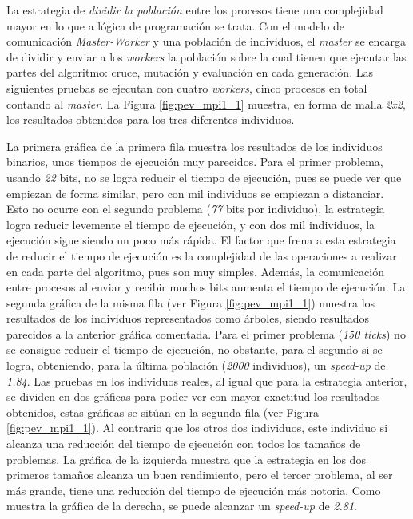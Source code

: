 \newpage



La estrategia de \textit{dividir la población} entre los procesos tiene una complejidad mayor en lo que a lógica de programación se trata. Con el modelo de comunicación \textit{Master-Worker} y una población de individuos, el \textit{master} se encarga de dividir y enviar a los \textit{workers} la población sobre la cual tienen que ejecutar las partes del algoritmo: cruce, mutación y evaluación en cada generación. Las siguientes pruebas se ejecutan con cuatro \textit{workers}, cinco procesos en total contando al \textit{master}. La Figura \ref{fig:pev_mpi1_1} muestra, en forma de malla \textit{2x2}, los resultados obtenidos para los tres diferentes individuos. 

La primera gráfica de la primera fila muestra los resultados de los individuos binarios, unos tiempos de ejecución muy parecidos. Para el primer problema, usando \textit{22} bits, no se logra reducir el tiempo de ejecución, pues se puede ver que empiezan de forma similar, pero con mil individuos se empiezan a distanciar. Esto no ocurre con el segundo problema (\textit{77} bits por individuo), la estrategia logra reducir levemente el tiempo de ejecución, y con dos mil individuos, la ejecución sigue siendo un poco más rápida. El factor que frena a esta estrategia de reducir el tiempo de ejecución es la complejidad de las operaciones a realizar en cada parte del algoritmo, pues son muy simples. Además, la comunicación entre procesos al enviar y recibir muchos bits aumenta el tiempo de ejecución. La segunda gráfica de la misma fila (ver Figura \ref{fig:pev_mpi1_1}) muestra los resultados de los individuos representados como árboles, siendo resultados parecidos a la anterior gráfica comentada. Para el primer problema (\textit{150 ticks}) no se consigue reducir el tiempo de ejecución, no obstante, para el segundo si se logra, obteniendo, para la última población (\textit{2000} individuos), un \textit{speed-up} de \textit{1.84}. Las pruebas en los individuos reales, al igual que para la estrategia anterior, se dividen en dos gráficas para poder ver con mayor exactitud los resultados obtenidos, estas gráficas se sitúan en la segunda fila (ver Figura \ref{fig:pev_mpi1_1}). Al contrario que los otros dos individuos, este individuo si alcanza una reducción del tiempo de ejecución con todos los tamaños de problemas. La gráfica de la izquierda muestra que la estrategia en los dos primeros tamaños alcanza un buen rendimiento, pero el tercer problema, al ser más grande, tiene una reducción del tiempo de ejecución más notoria. Como muestra la gráfica de la derecha, se puede alcanzar un \textit{speed-up} de \textit{2.81}.

